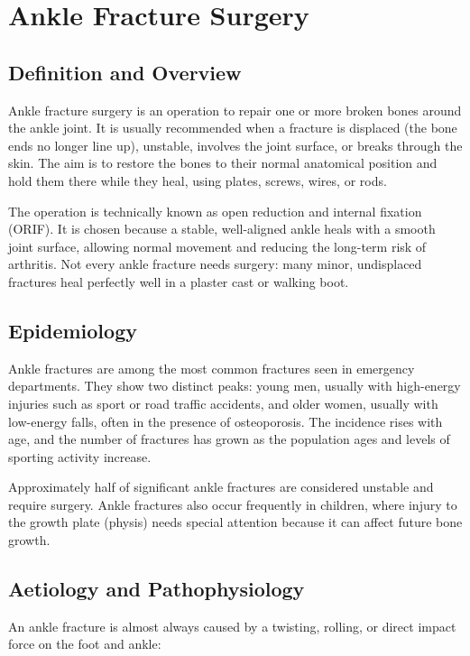 \chapter{Ankle Fracture Surgery}

\section*{Definition and Overview}
Ankle fracture surgery is an operation to repair one or more broken bones around the ankle joint. It is usually recommended when a fracture is displaced (the bone ends no longer line up), unstable, involves the joint surface, or breaks through the skin. The aim is to restore the bones to their normal anatomical position and hold them there while they heal, using plates, screws, wires, or rods.

The operation is technically known as open reduction and internal fixation (ORIF). It is chosen because a stable, well-aligned ankle heals with a smooth joint surface, allowing normal movement and reducing the long-term risk of arthritis. Not every ankle fracture needs surgery: many minor, undisplaced fractures heal perfectly well in a plaster cast or walking boot.

\section*{Epidemiology}
Ankle fractures are among the most common fractures seen in emergency departments. They show two distinct peaks: young men, usually with high-energy injuries such as sport or road traffic accidents, and older women, usually with low-energy falls, often in the presence of osteoporosis. The incidence rises with age, and the number of fractures has grown as the population ages and levels of sporting activity increase.

Approximately half of significant ankle fractures are considered unstable and require surgery. Ankle fractures also occur frequently in children, where injury to the growth plate (physis) needs special attention because it can affect future bone growth.

\section*{Aetiology and Pathophysiology}
An ankle fracture is almost always caused by a twisting, rolling, or direct impact force on the foot and ankle:

